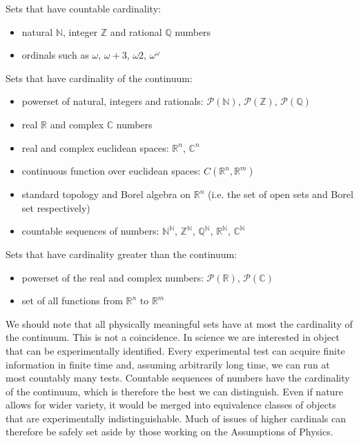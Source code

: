 \documentclass{article}
\begin{document}
\begin{remark}
	Sets that have countable cardinality:
	\begin{itemize}
		\item natural $\mathbb{N}$, integer $\mathbb{Z}$ and rational $\mathbb{Q}$ numbers 
		\item ordinals such as $\omega$, $\omega + 3$, $\omega2$, $\omega^\omega$
	\end{itemize}
	Sets that have cardinality of the continuum:
	\begin{itemize}
		\item powerset of natural, integers and rationals: $\mathcal{P}(\mathbb{N})$, $\mathcal{P}(\mathbb{Z})$, $\mathcal{P}(\mathbb{Q})$
		\item real $\mathbb{R}$ and complex $\mathbb{C}$ numbers
		\item real and complex euclidean spaces: $\mathbb{R}^n$, $\mathbb{C}^n$
		\item continuous function over euclidean spaces: $C(\mathbb{R}^n, \mathbb{R}^m)$
		\item standard topology and Borel algebra on $\mathbb{R}^n$ (i.e. the set of open sets and Borel set respectively)
		\item countable sequences of numbers: $\mathbb{N}^\mathbb{N}$, $\mathbb{Z}^\mathbb{N}$, $\mathbb{Q}^\mathbb{N}$, $\mathbb{R}^\mathbb{N}$, $\mathbb{C}^\mathbb{N}$
	\end{itemize}
	Sets that have cardinality greater than the continuum:
	\begin{itemize}
		\item powerset of the real and complex numbers: $\mathcal{P}(\mathbb{R})$, $\mathcal{P}(\mathbb{C})$
		\item set of all functions from $\mathbb{R}^n$ to $\mathbb{R}^m$
	\end{itemize}

	We should note that all physically meaningful sets have at most the cardinality of the continuum. This is not a coincidence. In science we are interested in object that can be experimentally identified. Every experimental test can acquire finite information in finite time and, assuming arbitrarily long time, we can run at most countably many tests. Countable sequences of numbers have the cardinality of the continuum, which is therefore the best we can distinguish. Even if nature allows for wider variety, it would be merged into equivalence classes of objects that are experimentally indistinguishable. Much of issues of higher cardinals can therefore be safely set aside by those working on the Assumptions of Physics.
\end{remark}
\end{document}
